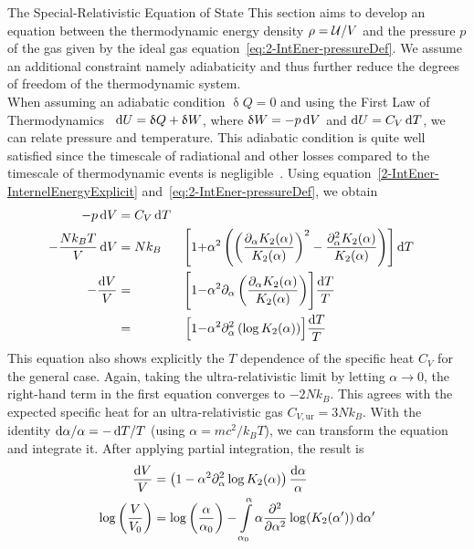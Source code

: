 \begin{subsection}{The Special-Relativistic Equation of State}
\label{2-IntEner-SR-EOS-Derivation}
This section aims to develop an equation between the thermodynamic energy density $\rho=\mathcal{U}/V$ and the pressure $p$ of the gas given by the ideal gas equation~\eqref{eq:2-IntEner-pressureDef}.
We assume an additional constraint namely adiabaticity and thus further reduce the degrees of freedom of the thermodynamic system.\\ %
When assuming an adiabatic condition $\updelta Q=0$ and using the First Law of Thermodynamics~\cite{fliessbachStatistischePhysikLehrbuch2018} $\mathop{}\!\mathrm{d} U =\updelta Q + \updelta W$, where $\updelta W=-p\mathop{}\!\mathrm{d} V$ and $\mathop{}\!\mathrm{d} U=C_V\mathop{}\!\mathrm{d} T$, we can relate pressure and temperature. 
This adiabatic condition is quite well satisfied since the timescale of radiational and other losses compared to the timescale of thermodynamic events is negligible~\cite{noerdlingerSolarMassLoss2008, vinkMassLossStellar2017}.
Using equation~\eqref{2-IntEner-InternelEnergyExplicit} and~\eqref{eq:2-IntEner-pressureDef}, we obtain
\begin{alignat}{3}
    -p\mathop{}\!\mathrm{d} V &= C_V\mathop{}\!\mathrm{d} T\\
    -\frac{Nk_B T}{V}\mathop{}\!\mathrm{d} V &= Nk_B &\Biggl[1 + &\alpha^2\left(\left(\frac{\partial_\alpha K_2(\alpha)}{K_2(\alpha)}\right)^2 - \frac{\partial^2_\alpha K_2(\alpha)}{K_2(\alpha)}\right)\Biggr]\mathop{}\!\mathrm{d} T\\
    - \frac{\mathop{}\!\mathrm{d} V}{V} &= &\Biggl[1 - &\alpha^2\partial_\alpha\left(\frac{\partial_\alpha K_2(\alpha)}{K_2(\alpha)}\right)\Biggr]\frac{\mathop{}\!\mathrm{d} T}{T}\\
    &= &\Bigl[1 - &\alpha^2\partial_\alpha^2\left(\log K_2(\alpha)\right)\Bigr]\frac{\mathop{}\!\mathrm{d} T}{T}
\end{alignat}
This equation also shows explicitly the $T$ dependence of the specific heat $C_V$ for the general case.
Again, taking the ultra-relativistic limit by letting $\alpha\rightarrow0$, the right-hand term in the first equation converges to $-2Nk_B$.
This agrees with the expected specific heat for an ultra-relativistic gas $C_{V,\text{ur}}=3Nk_B$.
With the identity $\mathop{}\!\mathrm{d}\alpha/\alpha = -\mathop{}\!\mathrm{d} T/T$ (using $\alpha=mc^2/k_B T$), we can transform the equation and integrate it.
After applying partial integration, the result is
\begin{align}
	\frac{\diff V}{V} &= \left(1-\alpha^2\partial_\alpha^2\log K_2(\alpha)\right)\frac{\diff\alpha}{\alpha}\\
    \log\left(\frac{V}{V_0}\right) &= \log\left(\frac{\alpha}{\alpha_0}\right) - \int\limits_{\alpha_0}^\alpha \alpha\frac{\partial^2}{\partial \alpha^2}\log(K_2(\alpha'))\diff\alpha'\\

\end{align}
\end{subsection}
